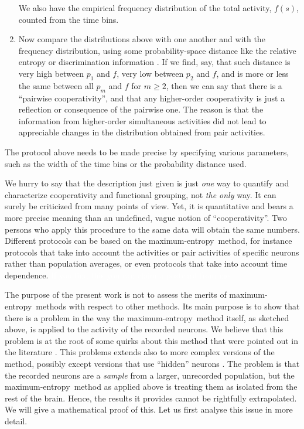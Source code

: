 \documentclass[\ifafour a4paper,12pt,\else a5paper,10pt,\fi%
onecolumn,oneside,article,%
british%
]{memoir}
\theoremstyle{remark}
\theoremstyle{innote}
\newcommand*{\citep}{\parencites}
\renewcommand*{\ge}{\geqslant}%
\renewcommand*{\|}{\nonscript\,\vert\nonscript\;\mathopen{}}
\newcommand*{\yrv}{s}
\newcommand*{\yrs}{\yrv}%
\newcommand*{\me}{maximum-entropy}
\begin{document}
\begin{enumerate}
  We also have the empirical frequency distribution of the total activity,
  $f(\yrs)$, counted from the time bins.

\item Now compare the distributions above with one another and with the
  frequency distribution, using some probability-space distance like the
  relative entropy or discrimination information
  \citep{kullback1987,jaynes1963,hobson1969,hobsonetal1973}. If we find,
  say, that such distance is very high between $p_1$ and $f$, very low
  between $p_2$ and $f$, and is more or less the same between all $p_m$ and
  $f$ for $m \ge 2$, then we can say that there is a \enquote{pairwise
    cooperativity}, and that any higher-order cooperativity is just a
  reflection or consequence of the pairwise one. The reason is that the
  information from higher-order simultaneous activities did not lead to
  appreciable changes in the distribution obtained from pair activities.
\end{enumerate}
The protocol above needs to be made precise by specifying various
parameters, such as the width of the time bins or the probability
distance used.

We hurry to say that the description just given is just \emph{one} way to
quantify and characterize cooperativity and functional grouping, not
\emph{the only} way. It can surely be criticized from many points of view.
Yet, it is quantitative and bears a more precise meaning than an undefined,
vague notion of \enquote{cooperativity}. Two persons who apply this
procedure to the same data will obtain the same numbers. Different
protocols can be based on the \me\ method, for instance protocols that take
into account the activities or pair activities of specific neurons rather
than population averages, or even protocols that take into account time
dependence.
\textcolor{white}{If you find this you can claim a postcard from me.}

The purpose of the present work is not to assess the merits of \me\ methods
with respect to other methods. Its main purpose is to show that there is a
problem in the way the \me\ method itself, as sketched above, is applied to
the activity of the recorded neurons. We believe that this problem is at
the root of some quirks about this method that were pointed out in the
literature \citep{roudietal2009b}. This problems extends also to more
complex versions of the method, possibly except versions that use
\enquote{hidden} neurons
\citep{smolensky1986,kulkarnietal2007,huang2015,dunnetal2017}. The problem is
that the recorded neurons are a \emph{sample} from a larger, unrecorded
population, but the \me\ method as applied above is treating them as
isolated from the rest of the brain. Hence, the results it provides cannot
be rightfully extrapolated. We will give a mathematical proof of this. Let
us first analyse this issue in more detail.
\end{document}

